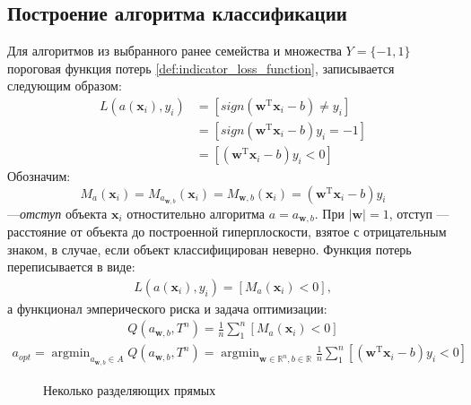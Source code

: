 \documentclass[%
bachelor,    %
subf,        %
href,        %
colorlinks,  %
]{disser}
\let\vec=\mathbf
\DeclareMathOperator*{\argmin}{argmin}
\begin{document}
\subsection{Построение алгоритма классификации}


Для алгоритмов из выбранного ранее семейства  и множества $Y=\{-1,1\}$ пороговая функция потерь \eqref{def:indicator_loss_function}, записывается следующим образом:
\begin{equation}
\begin{aligned}
L(a(\vec{x}_i),y_i)&=[sign(\vec{w}^\mathrm{T}\vec{x}_i - b) \neq y_i] \\
&= [sign(\vec{w}^\mathrm{T}\vec{x}_i - b)  y_i = -1] \\
&= [(\vec{w}^\mathrm{T}\vec{x}_i - b)  y_i < 0]
\end{aligned}
\end{equation}
Обозначим:
$$M_{a}(\vec{x}_i) = M_{a_{\vec{w},b}}(\vec{x}_i)= M_{\vec{w},b}(\vec{x}_i) = (\vec{w}^\mathrm{T}\vec{x}_i - b)  y_i$$ 
---\textit{отступ} объекта $\vec{x}_i$ отностительно алгоритма $a = a_{\vec{w},b}$.
При $|\vec{w}|= 1$, отступ --- расстояние от объекта до построенной гиперплоскости, взятое с отрицательным знаком, в случае, если объект классифицирован неверно. Функция потерь переписывается в виде:
\begin{equation}
\begin{aligned}
L(a(\vec{x}_i),y_i)=[M_{a}(\vec{x}_i) <0],
\end{aligned}
\end{equation} 
а функционал эмперического риска и задача оптимизации: 
\begin{equation}
\begin{aligned}
Q(a_{\vec{w},b},T^n)=\frac{1}{n} \sum_{1}^{n} [M_{a}(\vec{x}_i) < 0]
\end{aligned}
\end{equation}
\begin{equation}
\begin{aligned}a_{opt} 
= \argmin_{a_{\vec{w},b} \in A} Q(a_{\vec{w},b},T^n) 
= \argmin_{\vec{w} \in \mathbb{R}^n, b \in \mathbb{R}} \frac{1}{n} \sum_{1}^{n} [(\vec{w}^\mathrm{T}\vec{x}_i - b)  y_i < 0]
\end{aligned}
\end{equation}
\begin{figure}
	\centering		
	
	\caption{Неколько разделяющих прямых}
	\label{fig:example3}
\end{figure}
\end{document}
